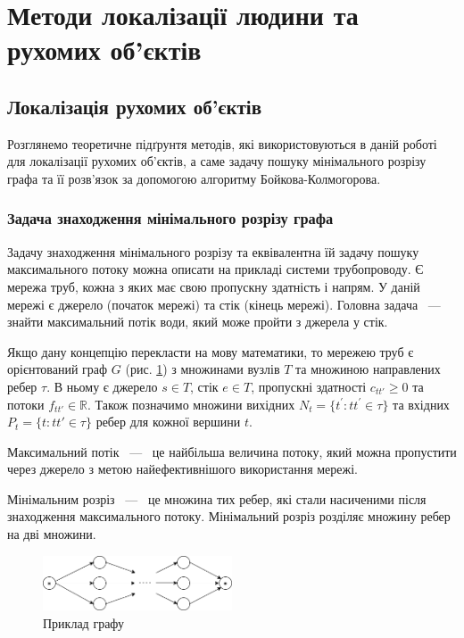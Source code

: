 \section{Методи локалізації людини та рухомих об'єктів}
\subsection{Локалізація рухомих об'єктів}

Розглянемо теоретичне підґрунтя методів, які використовуються в даній роботі для
локалізації рухомих об'єктів, а саме задачу пошуку мінімального розрізу графа
та її розв'язок за допомогою алгоритму Бойкова-Колмогорова.

\subsubsection{Задача знаходження мінімального розрізу графа}

Задачу знаходження мінімального розрізу та еквівалентна їй задачу пошуку максимального потоку
можна описати на прикладі системи трубопроводу.
Є мережа труб, кожна з яких має свою пропускну здатність і напрям.
У даній мережі є джерело (початок мережі) та стік (кінець мережі).
Головна задача ~---~ знайти максимальний потік води,
який може пройти з джерела у стік.

Якщо дану концепцію перекласти на мову
математики, то мережею труб є орієнтований граф $G$ (рис. \ref{fig:graph_example})
з множинами вузлів $T$ та множиною направлених ребер $\tau$.
В ньому є джерело $s \in T$, стік $e \in T$, пропускні здатності $c_{tt'} \ge 0$
та потоки $f_{tt'} \in \mathbb{R}$.
Також позначимо множини вихідних $N_t = \{t^{'}: tt^{'} \in \tau \}$
та вхідних $P_t = \{t: tt' \in \tau \}$ ребер для кожної вершини $t$.
\begin{definition}
    Максимальний потік ~---~  це найбільша величина потоку, який
    можна пропустити через джерело з метою найефективнішого  використання мережі.
\end{definition}

\begin{definition}
    Мінімальним розріз ~---~ це множина тих ребер, які стали насиченими після знаходження максимального
    потоку. Мінімальний розріз розділяє множину ребер на дві множини.
\end{definition}
\begin{figure}[H]
    \centering
    \includegraphics[width=0.5\textwidth]{images/graph_example}
    \caption{Приклад графу
        \label{fig:graph_example}
    }
\end{figure}

